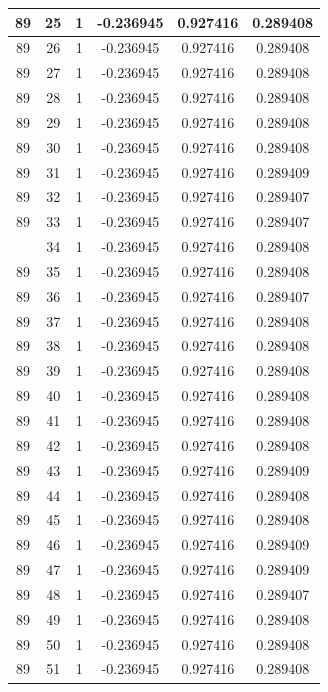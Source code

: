 \documentclass[12pt,a4paper]{article}
\numberwithin{equation}{section}
\numberwithin{figure}{section}
\numberwithin{table}{section}
\begin{document}
\begin{longtable}{|c|c|c|c|c|c|}
89 & 25 & 1 & -0.236945 & 0.927416 & 0.289408 \\ \hline
89 & 26 & 1 & -0.236945 & 0.927416 & 0.289408 \\ \hline
89 & 27 & 1 & -0.236945 & 0.927416 & 0.289408 \\ \hline
89 & 28 & 1 & -0.236945 & 0.927416 & 0.289408 \\ \hline
89 & 29 & 1 & -0.236945 & 0.927416 & 0.289408 \\ \hline
89 & 30 & 1 & -0.236945 & 0.927416 & 0.289408 \\ \hline
89 & 31 & 1 & -0.236945 & 0.927416 & 0.289409 \\ \hline
89 & 32 & 1 & -0.236945 & 0.927416 & 0.289407 \\ \hline
89 & 33 & 1 & -0.236945 & 0.927416 & 0.289407 \\ \hline
\pagebreak
89 & 34 & 1 & -0.236945 & 0.927416 & 0.289408 \\ \hline
89 & 35 & 1 & -0.236945 & 0.927416 & 0.289408 \\ \hline
89 & 36 & 1 & -0.236945 & 0.927416 & 0.289407 \\ \hline
89 & 37 & 1 & -0.236945 & 0.927416 & 0.289408 \\ \hline
89 & 38 & 1 & -0.236945 & 0.927416 & 0.289408 \\ \hline
89 & 39 & 1 & -0.236945 & 0.927416 & 0.289408 \\ \hline
89 & 40 & 1 & -0.236945 & 0.927416 & 0.289408 \\ \hline
89 & 41 & 1 & -0.236945 & 0.927416 & 0.289408 \\ \hline
89 & 42 & 1 & -0.236945 & 0.927416 & 0.289408 \\ \hline
89 & 43 & 1 & -0.236945 & 0.927416 & 0.289409 \\ \hline
89 & 44 & 1 & -0.236945 & 0.927416 & 0.289408 \\ \hline
89 & 45 & 1 & -0.236945 & 0.927416 & 0.289408 \\ \hline
89 & 46 & 1 & -0.236945 & 0.927416 & 0.289409 \\ \hline
89 & 47 & 1 & -0.236945 & 0.927416 & 0.289409 \\ \hline
89 & 48 & 1 & -0.236945 & 0.927416 & 0.289407 \\ \hline
89 & 49 & 1 & -0.236945 & 0.927416 & 0.289408 \\ \hline
89 & 50 & 1 & -0.236945 & 0.927416 & 0.289408 \\ \hline
89 & 51 & 1 & -0.236945 & 0.927416 & 0.289408 \\ \hline

\end{longtable}
\end{document}
